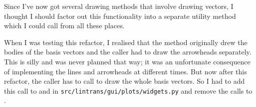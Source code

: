 \documentclass[../development.tex]{subfiles}
\begin{document}
Since I've now got several drawing methods that involve drawing vectors, I thought I should factor out this functionality into a separate utility method which I could call from all these places.


When I was testing this refactor, I realised that the  method originally drew the bodies of the basis vectors and the caller had to draw the arrowheads separately. This is silly and was never planned that way; it was an unfortunate consequence of implementing the lines and arrowheads at different times. But now after this refactor, the caller has to call  to draw the whole basis vectors. So I had to add this call to  and  in \texttt{src/lintrans/gui/plots/widgets.py} and remove the calls to .
\end{document}
